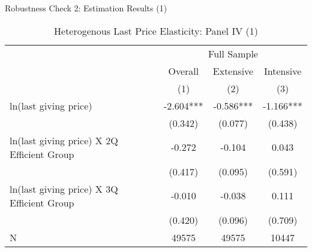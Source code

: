 \documentclass[
  ignorenonframetext,
]{beamer}
\begin{document}
\begin{frame}{Robustness Check 2: Estimation Results (1)}
\protect\hypertarget{robustness-check-2-estimation-results-1}{}
\begin{table}

\caption{\label{tab:kableHeteroLastElasticitySlide1}Heterogenous Last Price Elasticity: Panel IV (1)}
\centering
\fontsize{8}{10}\selectfont
\begin{tabular}[t]{lccc}
\toprule
\multicolumn{1}{c}{ } & \multicolumn{3}{c}{Full Sample} \\
\cmidrule(l{3pt}r{3pt}){2-4}
\multicolumn{1}{c}{ } & \multicolumn{1}{c}{Overall} & \multicolumn{1}{c}{Extensive} & \multicolumn{1}{c}{Intensive} \\
\cmidrule(l{3pt}r{3pt}){2-2} \cmidrule(l{3pt}r{3pt}){3-3} \cmidrule(l{3pt}r{3pt}){4-4}
 & (1) & (2) & (3)\\
\midrule
ln(last giving price) & -2.604*** & -0.586*** & -1.166***\\
 & (0.342) & (0.077) & (0.438)\\
ln(last giving price) X 2Q Efficient Group & -0.272 & -0.104 & 0.043\\
 & (0.417) & (0.095) & (0.591)\\
ln(last giving price) X 3Q Efficient Group & -0.010 & -0.038 & 0.111\\
 & (0.420) & (0.096) & (0.709)\\
N & 49575 & 49575 & 10447\\
\bottomrule
\end{tabular}
\end{table}
\end{frame}
\end{document}
